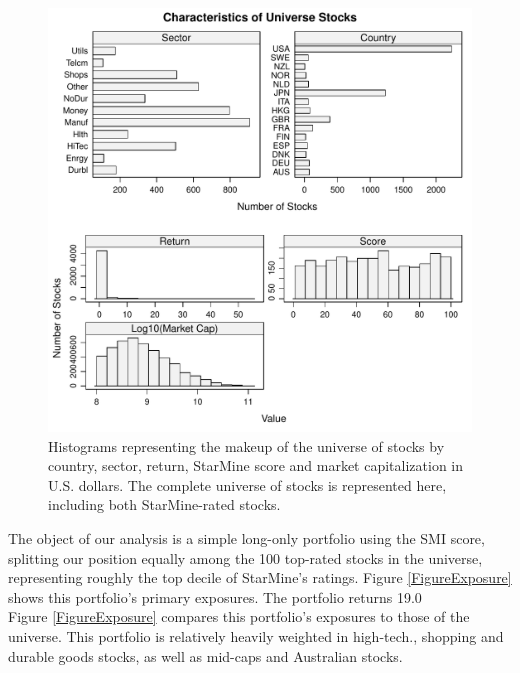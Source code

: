 \documentclass{article}\usepackage{graphicx, color}
\makeatletter
\def\maxwidth{ %
  \ifdim\Gin@nat@width>\linewidth
    \linewidth
  \else
    \Gin@nat@width
  \fi
}
\newenvironment{knitrout}{}{} %
\makeatother
\begin{document}
\begin{figure}
\begin{center}

\begin{knitrout}
\color{fgcolor}
\includegraphics[width=\maxwidth]{figure/unnamed-chunk-4} 

\end{knitrout}

\end{center}
\caption{Histograms representing the makeup of the universe of stocks
  by country, sector, return, StarMine score and market capitalization
  in U.S. dollars. The complete universe of stocks is represented
  here, including both StarMine-rated stocks.}
\label{FigureStarMine}
\end{figure}




The object of our analysis is a simple long-only portfolio using the SMI score,
splitting our position equally among the 100
top-rated stocks in the universe, representing roughly the top decile of
StarMine's ratings. Figure \ref{FigureExposure} shows this portfolio's
primary exposures. The portfolio returns
19.0\\%

Figure \ref{FigureExposure} compares this portfolio's exposures
to those of the universe. This portfolio is relatively heavily weighted in
high-tech., shopping and durable goods stocks, as well as mid-caps and
Australian stocks.
\end{document}
